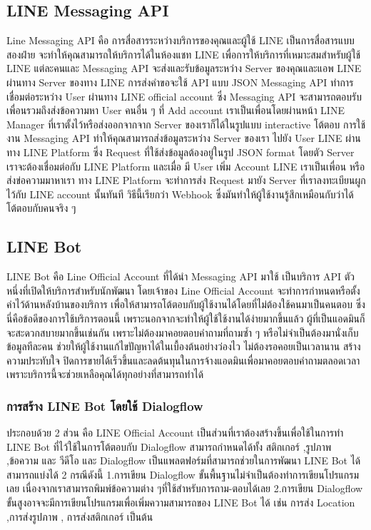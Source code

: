 \subsection{LINE Messaging API} 
\quad Line Messaging API คือ การสื่อสารระหว่างบริการของคุณและผู้ใช้ LINE เป็นการสื่อสารแบบสองฝ่าย จะทำให้คุณสามารถให้บริการได้ในห้องแชท LINE เพื่อการให้บริการที่เหมาะสมสำหรับผู้ใช้ LINE แต่ละคนและ Messaging API จะส่งและรับข้อมูลระหว่าง Server ของคุณและแอพ LINE ผ่านทาง Server ของทาง LINE การส่งคำขอจะใช้ API แบบ JSON Messaging API ทำการเชื่อมต่อระหว่าง User ผ่านทาง LINE official account ซึ่ง Messaging API จะสามารถตอบรับเพื่อนรวมถึงส่งข้อความหา User คนอื่น ๆ ที่ Add account เราเป็นเพื่อนโดยผ่านหน้า LINE Manager ที่เราตั้งไว้หรือส่งออกจากจาก Server ของเราก็ได้ในรูปแบบ interactive โต้ตอบ  การใช้งาน Messaging API ทำให้คุณสามารถส่งข้อมูลระหว่าง Server ของเรา ไปยัง User LINE ผ่านทาง LINE Platform ซึ่ง Request ที่ใช้ส่งข้อมูลต้องอยู่ในรูป JSON format โดยตัว Server เราจะต้องเชื่อมต่อกับ LINE Platform และเมื่อ มี User เพิ่ม Account LINE เราเป็นเพื่อน หรือ ส่งข่อความมาหาเรา ทาง LINE Platform จะทำการส่ง Request มายัง Server ที่เราลงทะเบียนผูกไว้กับ LINE account นั้นทันที วิธีนี้เรียกว่า Webhook ซึ่งมันทำให้ผู้ใช้งานรู้สึกเหมือนกับว่าได้โต้ตอบกับคนจริง ๆ 

\subsection{LINE Bot} 
\quad LINE Bot คือ Line Official Account ที่ได้นำ Messaging API มาใช้ เป็นบริการ API ตัวหนึ่งที่เปิดให้บริการสำหรับนักพัฒนา โดยเจ้าของ Line Official Account จะทำการกำหนดหรือตั้งค่าไว้ด้านหลังบ้านของบริการ เพื่อให้สามารถโต้ตอบกับผู้ใช้งานได้โดยที่ไม่ต้องใช้คนมาเป็นคนตอบ ซึ่งนี่คือข้อดีของการใช้บริการตอนนี้ เพราะนอกจากจะทำให้ผู้ใช้ใช้งานได้ง่ายมากขึ้นแล้ว ผู้ที่เป็นแอดมินก็จะสะดวกสบายมากขึ้นเช่นกัน เพราะไม่ต้องมาคอยตอบคำถามที่ถามซ้ำ ๆ หรือไม่จำเป็นต้องมานั่งเก็บข้อมูลทีละคน ช่วยให้ผู้ใช้งานแก้ไขปัญหาได้ในเบื้องต้นอย่างว่องไว ไม่ต้องรอคอยเป็นเวลานาน สร้างความประทับใจ ปิดการขายได้เร็วขึ้นและลดต้นทุนในการจ้างแอดมินเพื่อมาคอยตอบคำถามตลอดเวลา เพราะบริการนี้จะช่วยเหลือคุณได้ทุกอย่างที่สามารถทำได้ 
\subsubsection{การสร้าง LINE Bot โดยใช้ Dialogflow} 
\quad ประกอบด้วย 2 ส่วน คือ LINE Official Account เป็นส่วนที่เราต้องสร้างขึ้นเพื่อใช้ในการทำ LINE Bot ที่ไว้ใช้ในการโต้ตอบกับ Dialogflow สามารถกำหนดได้ทั้ง สติกเกอร์ ,รูปภาพ ,ข้อความ และ วีดีโอ และ Dialogflow เป็นแพลตฟอร์มที่สามารถช่วยในการพัฒนา LINE Bot ได้สามารถแบ่งได้ 2 กรณีดังนี้ 1.การเขียน Dialogflow ขั้นพื้นฐานไม่จำเป็นต้องทำการเขียนโปรแกรมเลย เนื่องจากเราสามารถพิมพ์ข้อความต่าง ๆที่ใช้สำหรับการถาม-ตอบได้เลย 2.การเขียน Dialogflow ขั้นสูงอาจจะมีการเขียนโปรแกรมเพื่อเพิ่มความสามารถของ LINE Bot ได้ เช่น การส่ง Location ,การส่งรูปภาพ , การส่งสติกเกอร์ เป็นต้น 

